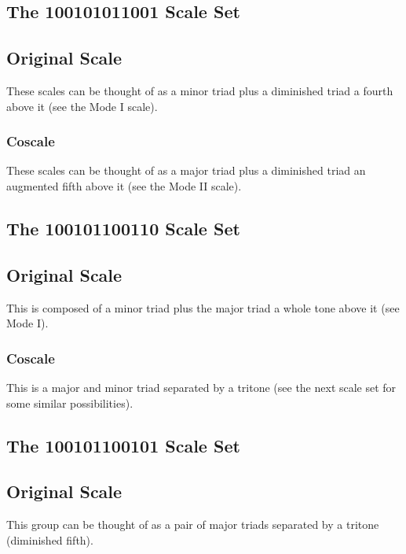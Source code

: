 \documentclass[english]{./gbook}
\begin{document}
\begin{large}
\subsection{The 100101011001 Scale Set}
\subsection*{Original Scale}
These scales can be thought of as a minor triad plus a diminished triad a fourth above it (see the Mode I scale).
\subsubsection*{Coscale}
These scales can be thought of as a major triad plus a diminished triad an augmented fifth above it (see the Mode II scale).

\subsection{The 100101100110 Scale Set}
\subsection*{Original Scale}
This is composed of a minor triad plus the major triad a whole tone above it (see Mode I).
\subsubsection*{Coscale}
This is a major and minor triad separated by a tritone (see the next scale set for some similar possibilities).

\subsection{The 100101100101 Scale Set}
\subsection*{Original Scale}
This group can be thought of as a pair of major triads separated by a tritone (diminished fifth).

\end{large}
\end{document}
